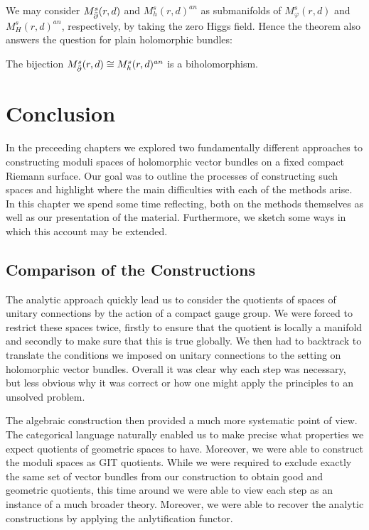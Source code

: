 \documentclass[12pt]{ociamthesis}  %
\begin{document}
We may consider $M^s_{\bar{\partial}}(r,d)$ and $M^s_h(r,d)^{an}$ as submanifolds
of $M^s_\varphi(r,d)$ and $M^s_H(r,d)^{an}$, respectively, by taking
the zero Higgs field. Hence the theorem also answers the question for plain
holomorphic bundles:

\begin{corollary}
  The bijection
  $M^s_{\bar{\partial}}(r,d) \cong M^s_h(r,d)^{an}$
  is a biholomorphism.
\end{corollary}

\chapter{Conclusion}

In the preceeding chapters we explored two fundamentally different
approaches to constructing moduli spaces of holomorphic vector
bundles on a fixed compact Riemann surface. Our goal was to
outline the processes of constructing such spaces and highlight where
the main difficulties with each of the methods arise.
In this chapter we spend some time reflecting, both on the methods
themselves as well as our presentation of the material.
Furthermore, we sketch some ways in which this account may be
extended.

\section{Comparison of the Constructions}

The analytic approach
quickly lead us to consider the quotients of spaces of unitary connections
by the action of a compact gauge group. We were forced to restrict these
spaces twice, firstly to ensure that the quotient is locally a manifold
and secondly to make sure that this is true globally. We then had to
backtrack to translate the conditions we imposed on unitary connections
to the setting on holomorphic vector bundles. Overall it was clear
why each step was necessary, but less obvious why it was correct or
how one might apply the principles to an unsolved problem.

The algebraic construction then provided a much more systematic
point of view. The categorical language naturally enabled us to make
precise what properties we expect quotients of geometric spaces to
have. Moreover, we were able to construct the moduli spaces as GIT
quotients. While we were required to exclude exactly the same set of
vector bundles from our construction to obtain good and geometric
quotients, this time around we were able to view each step as an
instance of a much broader theory. Moreover, we were able to recover
the analytic constructions by applying the anlytification functor.
\end{document}

